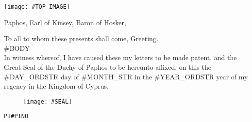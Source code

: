 \documentclass[varwidth=true,border=50pt]{standalone}
\begin{document}
\thispagestyle{fancy}

\noindent \texttt{[image: \#TOP\_IMAGE]}

{\LARGE
    Paphos, Earl of Kinsey, Baron of Hosker,

    \hspace{20pt} To all to whom these presents shall come, Greeting.\\

    \hspace{20pt} #BODY\\

    \hspace{20pt} In witness whereof, I have caused these my letters to be made patent, and the Great Seal of the Duchy of Paphos to be hereunto affixed, on this the #DAY_ORDSTR day of #MONTH_STR in the #YEAR_ORDSTR year of my regency in the Kingdom of Cyprus.
}

\begin{figure}[h]
    \centering
    \texttt{[image: \#SEAL]}
\end{figure}

\hfill {\footnotesize \texttt{PI{#PINO}}}
\end{document}
